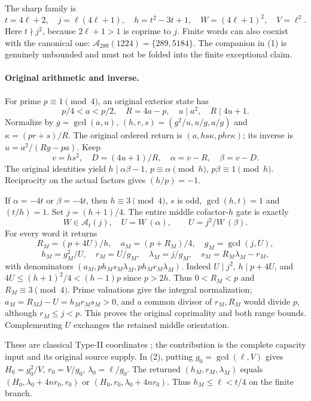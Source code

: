 \documentclass[10pt]{article}
\begin{document}
The sharp family is
\[
 t=4\ell+2,\quad j=\ell(4\ell+1),\quad
 h=t^2-3t+1,\quad W=(4\ell+1)^2,\quad V=\ell^2.           \tag{3}
\]
Here $t\nmid j^2$, because $2\ell+1>1$ is coprime to $j$. Finite words can
also coexist with the canonical one: $\mathcal A_{289}(1224)=\{289,5184\}$.
The companion in (1) is genuinely unbounded and must not be folded into the
finite exceptional claim.

\paragraph{Original arithmetic and inverse.}
For prime $p\equiv1\pmod4$, an original exterior state has
\[
 p/4<a<p/2,\quad R=4a-p,\quad u\mid a^2,\quad R\mid4u+1.
\]
Normalize by $g=\gcd(a,u)$, $(h,r,s)=(g^2/u,u/g,a/g)$ and
$\kappa=(pr+s)/R$. The original ordered return is
$(a,hs\kappa,phr\kappa)$; its inverse is $u=a^2/(Ry-pa)$.
Keep
\[
 v=hs^2,\quad D=(4u+1)/R,\quad
 \alpha=v-R,\quad\beta=v-D.
\]
The original identities yield
$h\mid\alpha\beta-1$, $p\equiv\alpha\pmod h$, $p\beta\equiv1\pmod h$.
Reciprocity on the actual factors gives $(h/p)=-1$.

If $\alpha=-4t$ or $\beta=-4t$, then
$h\equiv3\pmod4$, $s$ is odd, $\gcd(h,t)=1$ and $(t/h)=1$.
Set $j=(h+1)/4$. The entire middle cofactor-$h$ gate is exactly
\[
 W\in\mathcal A_t(j),\quad
 U=W\ (\alpha),\qquad U=j^2/W\ (\beta).
\]
For every word it returns
\[
 R_M=(p+4U)/h,\quad a_M=(p+R_M)/4,\quad g_M=\gcd(j,U),
\]
\[
 h_M=g_M^2/U,\quad r_M=U/g_M,\quad\lambda_M=j/g_M,
 \quad s_M=R_M\lambda_M-r_M,                             \tag{4}
\]
with denominators $(a_M,ph_Ms_M\lambda_M,ph_Mr_M\lambda_M)$.
Indeed $U\mid j^2$, $h\mid p+4U$, and
$4U\le(h+1)^2/4<(h-1)p$ since $p>2h$. Thus $0<R_M<p$ and
$R_M\equiv3\pmod4$. Prime valuations give the integral normalization;
$a_M=R_Mj-U=h_Mr_Ms_M>0$, and a common divisor of $r_M,R_M$ would divide
$p$, although $r_M\le j<p$. This proves the original coprimality and both range
bounds. Complementing $U$ exchanges the retained middle orientation.

These are classical Type-II coordinates \cite[\S2]{ET}; the contribution is the
complete capacity input and its original source supply. In (2), putting
$g_0=\gcd(\ell,V)$ gives $H_0=g_0^2/V$, $r_0=V/g_0$, $\lambda_0=\ell/g_0$.
The returned $(h_M,r_M,\lambda_M)$ equals
$(H_0,\lambda_0+4nr_0,r_0)$ or $(H_0,r_0,\lambda_0+4nr_0)$.
Thus $h_M\le\ell<t/4$ on the finite branch.
\end{document}
